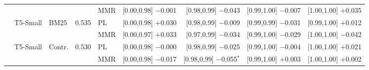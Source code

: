 \documentclass[10pt,twocolumn]{article}
\begin{document}
\begin{table}[t]
\begin{tabular}{@{}lllrlrrrr@{}}
 & & & & MMR & [0.00,0.98] $-$0.001 & [0.98,0.99] $-$0.043 & [0.99,1.00] $-$0.007 & [1.00,1.00] $+$0.035 \\
\cmidrule(lr){1-9}
 & \multirow{2}{*}{T5-Small} & \multirow{2}{*}{BM25} & \multirow{2}{*}{0.535} & PL & [0.00,0.98] $+$0.030 & [0.98,0.99] $-$0.009 & [0.99,0.99] $-$0.031 & [0.99,1.00] $+$0.012 \\
 & & & & MMR & [0.00,0.97] $+$0.033 & [0.97,0.99] $-$0.034 & [0.99,1.00] $-$0.029 & [1.00,1.00] $-$0.042 \\
\cmidrule(lr){1-9}
 & \multirow{2}{*}{T5-Small} & \multirow{2}{*}{Contr.} & \multirow{2}{*}{0.530} & PL & [0.00,0.98] $-$0.000 & [0.98,0.99] $-$0.025 & [0.99,1.00] $-$0.004 & [1.00,1.00] $+$0.021 \\
 & & & & MMR & [0.00,0.98] $-$0.017 & [0.98,0.99] $-$0.055$^{*}$ & [0.99,1.00] $+$0.003 & [1.00,1.00] $+$0.002 \\
\bottomrule
\end{tabular}
\end{table}
\end{document}

